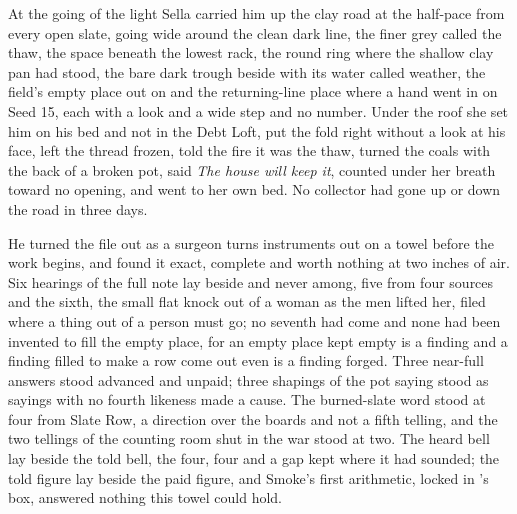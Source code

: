 At the going of the light Sella carried him up the clay road at the half-pace from every open slate, going wide around the clean dark line, the finer grey called the thaw, the space beneath the lowest rack, the round ring where the shallow clay pan had stood, the bare dark trough beside  with its water called weather, the field's empty place out on  and the returning-line place where a hand went in on Seed 15, each with a look and a wide step and no number. Under the roof she set him on his bed and not in the Debt Loft, put the fold right without a look at his face, left the thread frozen, told the fire it was the thaw, turned the coals with the back of a broken pot, said \emph{The house will keep it}, counted under her breath toward no opening, and went to her own bed. No collector had gone up or down the road in three days.

\scenebreak

He turned the file out as a surgeon turns instruments out on a towel before the work begins, and found it exact, complete and worth nothing at two inches of air. Six hearings of the full note lay beside and never among, five from four sources and the sixth, the small flat knock out of a woman as the men lifted her, filed where a thing out of a person must go; no seventh had come and none had been invented to fill the empty place, for an empty place kept empty is a finding and a finding filled to make a row come out even is a finding forged. Three near-full answers stood advanced and unpaid; three shapings of the pot saying stood as sayings with no fourth likeness made a cause. The burned-slate word stood at four from Slate Row, a direction over the boards and not a fifth telling, and the two tellings of the counting room shut in the war stood at two. The heard bell lay beside the told bell, the four, four and a gap kept where it had sounded; the told figure lay beside the paid figure, and Smoke's first arithmetic, locked in 's box, answered nothing this towel could hold.


